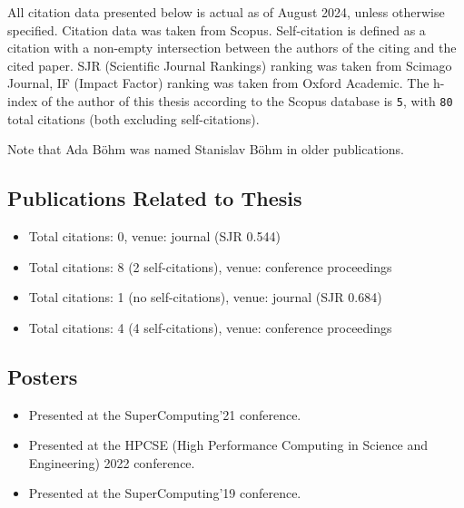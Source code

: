 All citation data presented below is actual as of August 2024, unless otherwise
specified. Citation data was taken from Scopus.
Self-citation is defined as a citation with a non-empty intersection between the authors of the citing and the cited paper.
SJR (Scientific Journal Rankings) ranking was taken from Scimago Journal,
IF (Impact Factor) ranking was taken from Oxford Academic.
The h-index of the author of this thesis according to the Scopus database is \texttt{5},
with \texttt{80} total citations (both excluding self-citations).

Note that Ada Böhm was named Stanislav Böhm in older publications.

\begin{refsection}
\renewcommand*{\mkbibnamegiven}[1]{%
	\ifitemannotation{highlight}
	{\textbf{#1}}
	{#1}}

\renewcommand*{\mkbibnamefamily}[1]{%
	\ifitemannotation{highlight}
	{\textbf{#1}}
	{#1}}

\section*{Publications Related to Thesis}
	\begin{itemize}
		\item{}\par{}Total citations: 0, venue: journal (SJR 0.544)
		\item{}\par{}Total citations: 8 (2 self-citations), venue: conference proceedings
		\item{}\par{}Total citations: 1 (no self-citations), venue: journal (SJR 0.684)
		\item{}\par{}Total citations: 4 (4 self-citations), venue: conference proceedings
	\end{itemize}

	\subsection*{Posters}
	\begin{itemize}
		\item{}\par{}Presented at the SuperComputing'21 conference.
		\item{}\par{}Presented at the HPCSE (High Performance
		Computing in Science and Engineering) 2022 conference.
		\item{}\par{}Presented at the SuperComputing'19 conference.
	\end{itemize}


\end{refsection}
